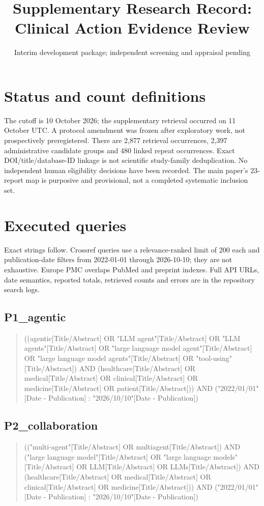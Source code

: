 \documentclass[journal,onecolumn,10pt]{IEEEtran}
\title{Supplementary Research Record: Clinical Action Evidence Review}
\author{Interim development package; independent screening and appraisal pending}
\begin{document}
\maketitle
\section{Status and count definitions}
The cutoff is 10 October 2026; the supplementary retrieval occurred on 11 October UTC. A protocol amendment was frozen after exploratory work, not prospectively preregistered. There are 2,877 retrieval occurrences, 2,397 administrative candidate groups and 480 linked repeat occurrences. Exact DOI/title/database-ID linkage is not scientific study-family deduplication. No independent human eligibility decisions have been recorded. The main paper's 23-report map is purposive and provisional, not a completed systematic inclusion set.
\section{Executed queries}
Exact strings follow. Crossref queries use a relevance-ranked limit of 200 each and publication-date filters from 2022-01-01 through 2026-10-10; they are not exhaustive. Europe PMC overlaps PubMed and preprint indexes. Full API URLs, date semantics, reported totals, retrieved counts and errors are in the repository search logs.

\subsection*{P1\_agentic}
\begin{quote}\small\raggedright ((agentic[Title/Abstract] OR "LLM agent"[Title/Abstract] OR "LLM agents"[Title/Abstract] OR "large language model agent"[Title/Abstract] OR "large language model agents"[Title/Abstract] OR "tool-using"[Title/Abstract]) AND (healthcare[Title/Abstract] OR medical[Title/Abstract] OR clinical[Title/Abstract] OR medicine[Title/Abstract] OR patient[Title/Abstract])) AND ("2022/01/01"[Date - Publication] : "2026/10/10"[Date - Publication])\end{quote}


\subsection*{P2\_collaboration}
\begin{quote}\small\raggedright (("multi-agent"[Title/Abstract] OR multiagent[Title/Abstract]) AND ("large language model"[Title/Abstract] OR "large language models"[Title/Abstract] OR LLM[Title/Abstract] OR LLMs[Title/Abstract]) AND (healthcare[Title/Abstract] OR medical[Title/Abstract] OR clinical[Title/Abstract] OR medicine[Title/Abstract])) AND ("2022/01/01"[Date - Publication] : "2026/10/10"[Date - Publication])\end{quote}
\end{document}
